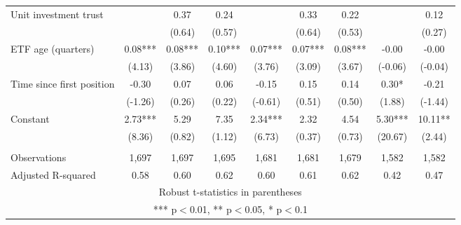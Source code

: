 \documentclass[]{article}
\begin{document}
\begin{tabular}{lcccccccc}
Unit investment trust &  & 0.37 & 0.24 &  & 0.33 & 0.22 &  & 0.12 \\
 &  & (0.64) & (0.57) &  & (0.64) & (0.53) &  & (0.27) \\
ETF age (quarters) & 0.08*** & 0.08*** & 0.10*** & 0.07*** & 0.07*** & 0.08*** & -0.00 & -0.00 \\
 & (4.13) & (3.86) & (4.60) & (3.76) & (3.09) & (3.67) & (-0.06) & (-0.04) \\
Time since first position & -0.30 & 0.07 & 0.06 & -0.15 & 0.15 & 0.14 & 0.30* & -0.21 \\
 & (-1.26) & (0.26) & (0.22) & (-0.61) & (0.51) & (0.50) & (1.88) & (-1.44) \\
Constant & 2.73*** & 5.29 & 7.35 & 2.34*** & 2.32 & 4.54 & 5.30*** & 10.11** \\
 & (8.36) & (0.82) & (1.12) & (6.73) & (0.37) & (0.73) & (20.67) & (2.44) \\
 &  &  &  &  &  &  &  &  \\
Observations & 1,697 & 1,697 & 1,695 & 1,681 & 1,681 & 1,679 & 1,582 & 1,582 \\
 Adjusted R-squared & 0.58 & 0.60 & 0.62 & 0.60 & 0.61 & 0.62 & 0.42 & 0.47 \\ \hline
\multicolumn{9}{c}{ Robust t-statistics in parentheses} \\
\multicolumn{9}{c}{ *** p$<$0.01, ** p$<$0.05, * p$<$0.1} \\
\end{tabular}
\end{document}
